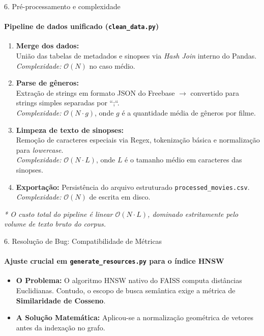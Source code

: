 \documentclass[10pt, aspectratio=169]{beamer}
\begin{document}
\begin{frame}{6. Pré-processamento e complexidade}
    \framesubtitle{Pipeline de dados unificado (\texttt{clean\_data.py})}
    \begin{enumerate}
        \item \textbf{Merge dos dados:} \\
        União das tabelas de metadados e sinopses via \textit{Hash Join} interno do Pandas. \\
        \textit{Complexidade:} $\mathcal{O}(N)$ no caso médio.
        
        \item \textbf{Parse de gêneros:} \\
        Extração de strings em formato JSON do Freebase $\rightarrow$ convertido para strings simples separadas por ``;``. \\
        \textit{Complexidade:} $\mathcal{O}(N \cdot g)$, onde $g$ é a quantidade média de gêneros por filme.
        
        \item \textbf{Limpeza de texto de sinopses:} \\
        Remoção de caracteres especiais via Regex, tokenização básica e normalização para \textit{lowercase}. \\
        \textit{Complexidade:} $\mathcal{O}(N \cdot L)$, onde $L$ é o tamanho médio em caracteres das sinopses.
        
        \item \textbf{Exportação:} Persistência do arquivo estruturado \texttt{processed\_movies.csv}. \\
        \textit{Complexidade:} $\mathcal{O}(N)$ de escrita em disco.
    \end{enumerate}
    \vspace{0.1cm}
    \footnotesize{\textit{* O custo total do pipeline é linear $\mathcal{O}(N \cdot L)$, dominado estritamente pelo volume de texto bruto do corpus.}}
\end{frame}

\begin{frame}{6. Resolução de Bug: Compatibilidade de Métricas}
    \framesubtitle{Ajuste crucial em \texttt{generate\_resources.py} para o índice HNSW}
    \begin{itemize}
        \item \textbf{O Problema:} O algoritmo HNSW nativo do FAISS computa distâncias  Euclidianas. Contudo, o escopo de busca semântica exige a métrica de \textbf{Similaridade de Cosseno}.
        \item \textbf{A Solução Matemática:} Aplicou-se a normalização geométrica de vetores antes da indexação no grafo.
        \end{itemize}
\end{frame}
\end{document}
